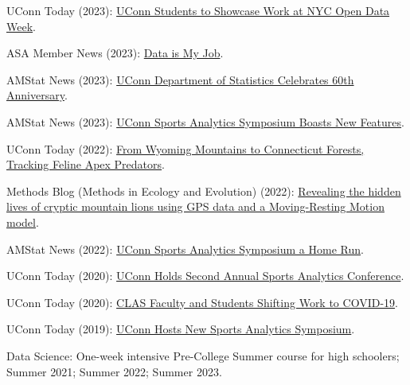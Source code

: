 \documentclass[Statistics]{vita}
\begin{document}
\begin{vita}
\begin{Services}
\begin{Media}
  \item UConn Today (2023): \href{https://today.uconn.edu/2023/03/uconn-students-to-showcase-work-at-nyc-open-data-week/}{UConn Students to Showcase Work at NYC Open Data Week}.
  \item ASA Member News (2023): \href{https://www.amstat.org/docs/default-source/amstat-documents/data-is-my-job-poster.pdf}{Data is My Job}.
  \item AMStat News (2023): \href{https://magazine.amstat.org/blog/2023/02/01/uconn-stats-dept-anniversary/}{UConn Department of Statistics Celebrates 60th Anniversary}.
  \item AMStat News (2023): \href{https://magazine.amstat.org/blog/2023/01/02/uconn-sports-analytics-symposium/}{UConn Sports Analytics Symposium Boasts New Features}.
  \item UConn Today (2022): \href{https://today.uconn.edu/2022/10/from-wyoming-mountains-to-connecticut-forests-tracking-feline-apex-predators/}{From Wyoming Mountains to Connecticut Forests, Tracking Feline Apex Predators}.
  \item Methods Blog (Methods in Ecology and Evolution) (2022): \href{https://methodsblog.com/2022/01/21/revealing-the-hidden-lives-of-cryptic-mountain-lions-using-gps-data-and-a-moving-resting-motion-model/}{Revealing the hidden lives of cryptic mountain lions using GPS data and a Moving-Resting Motion model}.
  \item AMStat News (2022): \href{https://magazine.amstat.org/blog/2022/01/01/uconn-sports-analytics/}{UConn Sports Analytics Symposium a Home Run}.
  \item UConn Today (2020): \href{https://today.uconn.edu/2020/10/uconn-holds-second-annual-sports-analytics-conference/}{UConn Holds Second Annual Sports Analytics Conference}.
  \item UConn Today (2020):
\href{https://today.uconn.edu/2020/04/clas-faculty-students-shifting-work-covid-19/}{CLAS Faculty and Students Shifting Work to COVID-19}.
  \item UConn Today (2019): \href{https://today.uconn.edu/school-stories/uconn-hosts-new-sports-analytics-symposium/}{UConn Hosts New Sports Analytics Symposium}.
  \end{Media}
\end{Services}
  \begin{TeachingExperience}
    \begin{UConn}
    \item Data Science: One-week intensive Pre-College Summer course for high schoolers; Summer 2021; Summer 2022; Summer 2023.

\end{UConn}
\end{TeachingExperience}
\end{vita}
\end{document}
